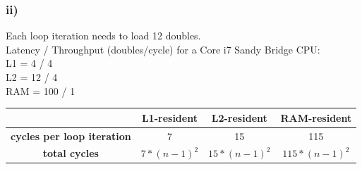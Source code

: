 \documentclass[10pt,a4paper,oneside,notitlepage]{report}
\begin{document}
\subsubsection*{ii)} 
Each loop iteration needs to load 12 doubles. \\
Latency / Throughput (doubles/cycle) for a Core i7 Sandy Bridge CPU: \\
L1 = 4 / 4 \\
L2 = 12 / 4 \\
RAM = 100 / 1 \\

\begin{tabular}{|c|c|c|c|}
\hline 
\rowcolor{gray!30}
 & \textbf{L1-resident} & \textbf{L2-resident} & \textbf{RAM-resident }\\ 
\hline 
\cellcolor{gray!30} \textbf{cycles per loop iteration} & 7 & 15 & 115 \\ 
\hline 
\cellcolor{gray!30} \textbf{total cycles} & $7*(n-1)^2$ & $15*(n-1)^2$ & $115*(n-1)^2$ \\ 
\hline 
\end{tabular} 
\end{document}
